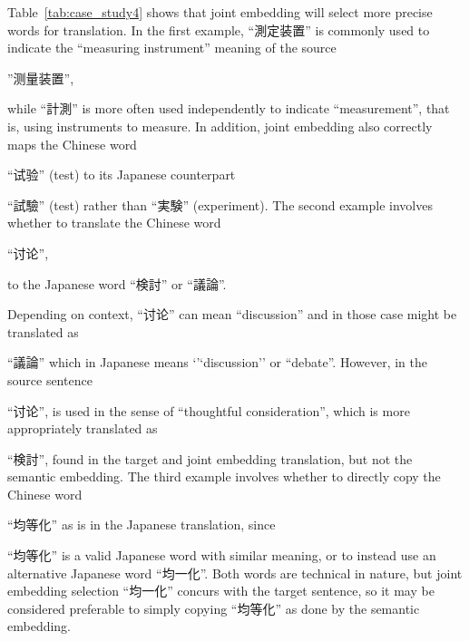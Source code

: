\begin{CJK}{UTF8}{ipxm}
Table~\ref{tab:case_study4} shows that joint embedding will select more precise words for translation. In the first example, ``測定装置'' is commonly used to indicate the ``measuring instrument'' meaning of the source \end{CJK}\begin{CJK}{UTF8}{gbsn}''测量装置'', \end{CJK}\begin{CJK}{UTF8}{ipxm} while ``計測'' is more often used independently to indicate ``measurement'', that is, using instruments to measure. In addition, joint embedding also correctly maps the Chinese word \end{CJK}\begin{CJK}{UTF8}{gbsn}``试验'' (test) to its Japanese counterpart \end{CJK}\begin{CJK}{UTF8}{ipxm}``試驗'' (test) rather than ``実験'' (experiment). The second example involves whether to translate the Chinese word \end{CJK}\begin{CJK}{UTF8}{gbsn}``讨论'', \end{CJK}\begin{CJK}{UTF8}{ipxm} to the Japanese word ``検討'' or ``議論''. \end{CJK}\begin{CJK}{UTF8}{gbsn} Depending on context, ``讨论'' can mean ``discussion'' and in those case might be translated as \end{CJK}\begin{CJK}{UTF8}{ipxm}``議論'' which in Japanese means `'`discussion'' or ``debate''. However, in the source sentence \end{CJK}\begin{CJK}{UTF8}{gbsn} ``讨论'', is used in the sense of ``thoughtful consideration'', which is more appropriately translated as \end{CJK}\begin{CJK}{UTF8}{ipxm} ``検討'', found in the target and joint embedding translation, but not the semantic embedding. The third example involves whether to directly copy the Chinese word \end{CJK}\begin{CJK}{UTF8}{gbsn}``均等化''
as is in the Japanese translation, since \end{CJK}\begin{CJK}{UTF8}{ipxm}``均等化'' is a valid Japanese word with similar meaning, or to instead use an alternative Japanese word \mbox{``均一化''}. Both words are technical in nature, but joint embedding selection ``均一化'' concurs with the target sentence, so it may be considered preferable to simply copying \mbox{``均等化''} as done by the semantic embedding.
\end{CJK}

